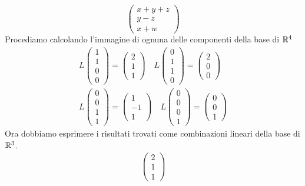 \begin{example}
\[\begin{pmatrix}
			x + y + z \\
			y - z     \\
			x + w
		\end{pmatrix}
	\]
	Procediamo calcolando l'immagine di ognuna delle componenti della base di $\mathbb{R}^4$
	\begin{align*}
		L \begin{pmatrix}
			  1 \\ 1 \\ 0 \\ 0
		  \end{pmatrix} =
		\begin{pmatrix}
			2 \\ 1 \\ 1
		\end{pmatrix} \quad
		L \begin{pmatrix}
			  0 \\ 1 \\ 1 \\ 0
		  \end{pmatrix} =
		\begin{pmatrix}
			2 \\ 0 \\ 0
		\end{pmatrix} \\
		L \begin{pmatrix}
			  0 \\ 0 \\ 1 \\ 1
		  \end{pmatrix} =
		\begin{pmatrix}
			1 \\ -1 \\ 1
		\end{pmatrix} \quad
		L \begin{pmatrix}
			  0 \\ 0 \\ 0 \\ 1
		  \end{pmatrix} =
		\begin{pmatrix}
			0 \\ 0 \\ 1
		\end{pmatrix}
	\end{align*}
	Ora dobbiamo esprimere i risultati trovati come combinazioni lineari della base di
	$\mathbb{R}^3$.
	\begin{gather*}
		\begin{pmatrix}
			2 \\ 1 \\ 1

\end{pmatrix}
\end{gather*}
\end{example}
